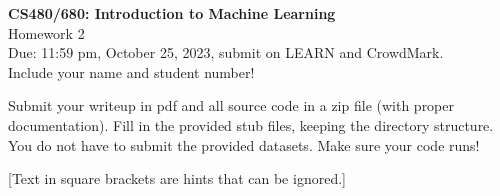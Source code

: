 \documentclass[10pt,letter,notitlepage]{article}
\begin{document}
\begin{center}
\large{\textbf{CS480/680: Introduction to Machine Learning} \\ Homework 2\\ Due: 11:59 pm, October 25, 2023, submit on LEARN and CrowdMark.} \\

Include your name and student number!

\end{center}

\begin{center}
Submit your writeup in pdf and all source code in a zip file (with proper documentation). 
Fill in the provided stub files, keeping the directory structure. You do not have to submit the provided datasets.
Make sure your code runs!

[Text in square brackets are hints that can be ignored.]
\end{center}
\end{document}
